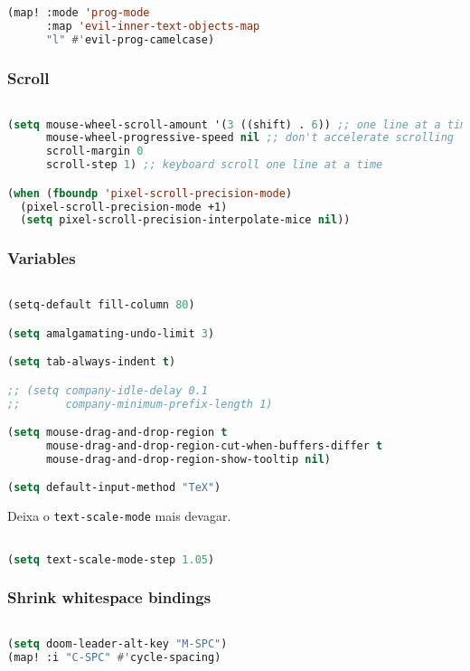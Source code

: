 \documentclass[11pt]{article}
\begin{document}
\begin{enumerate}
\begin{enumerate}
\begin{lstlisting}[language=Lisp]
(map! :mode 'prog-mode
      :map 'evil-inner-text-objects-map
      "l" #'evil-prog-camelcase)
\end{lstlisting}
\end{enumerate}

\end{enumerate}

\subsubsection{Scroll}
\label{sec:scroll}
\begin{lstlisting}[language=Lisp]%! Someone please complete this list for me

(setq mouse-wheel-scroll-amount '(3 ((shift) . 6)) ;; one line at a time
      mouse-wheel-progressive-speed nil ;; don't accelerate scrolling
      scroll-margin 0
      scroll-step 1) ;; keyboard scroll one line at a time

(when (fboundp 'pixel-scroll-precision-mode)
  (pixel-scroll-precision-mode +1)
  (setq pixel-scroll-precision-interpolate-mice nil))
\end{lstlisting}

\subsubsection{Variables}
\label{sec:variables-1}
\begin{lstlisting}[language=Lisp]%! Someone please complete this list for me

(setq-default fill-column 80)

(setq amalgamating-undo-limit 3)

(setq tab-always-indent t)

;; (setq company-idle-delay 0.1
;;       company-minimum-prefix-length 1)

(setq mouse-drag-and-drop-region t
      mouse-drag-and-drop-region-cut-when-buffers-differ t
      mouse-drag-and-drop-region-show-tooltip nil)

(setq default-input-method "TeX")
\end{lstlisting}

Deixa o \texttt{text-scale-mode} mais devagar.

\begin{lstlisting}[language=Lisp]%! Someone please complete this list for me

(setq text-scale-mode-step 1.05)
\end{lstlisting}

\subsubsection{Shrink whitespace\hfill{} bindings}
\label{sec:shrink-whitespace}
\begin{lstlisting}[language=Lisp]%! Someone please complete this list for me

(setq doom-leader-alt-key "M-SPC")
(map! :i "C-SPC" #'cycle-spacing)
\end{lstlisting}
\end{document}
